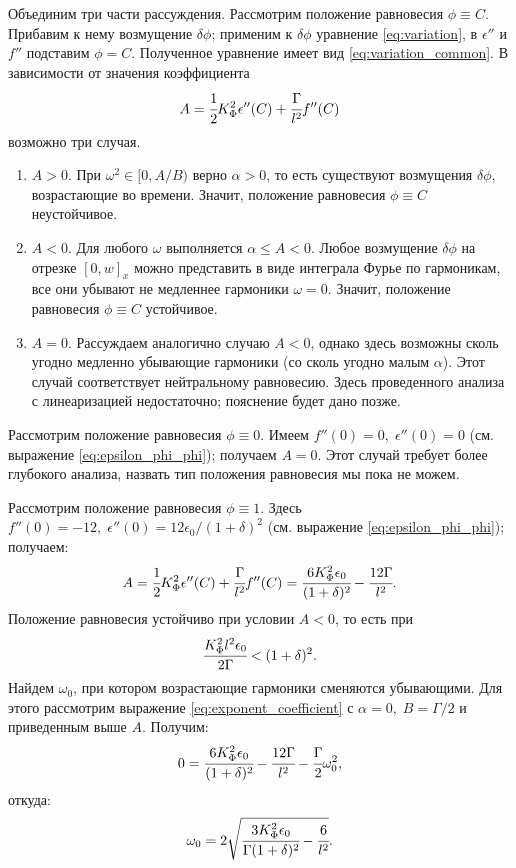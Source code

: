 Объединим три части рассуждения. Рассмотрим положение равновесия $\phi \equiv C$. Прибавим к нему возмущение $\delta \phi$; применим к $\delta \phi$ уравнение \eqref{eq:variation}, в $\epsilon''$ и $f''$ подставим $\phi = C$. Полученное уравнение имеет вид \eqref{eq:variation_common}. В зависимости от значения коэффициента
$$A = \cfrac{1}{2} K_\Phi^2 \epsilon''(C) + \cfrac{\Gamma}{l^2} f''(C)$$
возможно три случая.
\begin{enumerate}[label=\arabic*.]
	\item $A > 0$. При $\omega^2 \in [0, A/B)$ верно $\alpha > 0$, то есть существуют возмущения $\delta \phi$, возрастающие во времени. Значит, положение равновесия $\phi \equiv C$ неустойчивое.
	\item $A < 0$. Для любого $\omega$ выполняется $\alpha \leqslant A < 0$. Любое возмущение $\delta \phi$ на отрезке $[0, w]_x$ можно представить в виде интеграла Фурье по гармоникам, все они убывают не медленнее гармоники $\omega = 0$. Значит, положение равновесия $\phi \equiv C$ устойчивое.
	\item $A = 0$. Рассуждаем аналогично случаю $A < 0$, однако здесь возможны сколь угодно медленно убывающие гармоники (со сколь угодно малым $\alpha$). Этот случай соответствует нейтральному равновесию. Здесь проведенного анализа с линеаризацией недостаточно; пояснение будет дано позже.
\end{enumerate}

Рассмотрим положение равновесия $\phi \equiv 0$. Имеем $f''(0) = 0, \; \epsilon''(0) = 0$ (см. выражение \eqref{eq:epsilon_phi_phi}); получаем $A = 0$. Этот случай требует более глубокого анализа, назвать тип положения равновесия мы пока не можем.

Рассмотрим положение равновесия $\phi \equiv 1$. Здесь $f''(0) = -12, \; \epsilon''(0) = 12 \epsilon_0/(1 + \delta)^2$ (см. выражение \eqref{eq:epsilon_phi_phi}); получаем:
$$A = \cfrac{1}{2} K_\Phi^2 \epsilon''(C) + \cfrac{\Gamma}{l^2} f''(C) = \cfrac{6 K_\Phi^2 \epsilon_0}{(1 + \delta)^2} - \cfrac{12 \Gamma}{l^2} {\text{.}}$$
Положение равновесия устойчиво при условии $A < 0$, то есть при
\begin{equation}
	\cfrac{K_\Phi^2 l^2 \epsilon_0}{2 \Gamma} < (1 + \delta)^2 {\text{.}}
	\label{cond:equilibrium_1_stable}
\end{equation}
Найдем $\omega_0$, при котором возрастающие гармоники сменяются убывающими. Для этого рассмотрим выражение \eqref{eq:exponent_coefficient} с $\alpha = 0, \; B = \Gamma / 2$ и приведенным выше $A$. Получим:
$$0 = \cfrac{6 K_\Phi^2 \epsilon_0}{(1 + \delta)^2} - \cfrac{12 \Gamma}{l^2} - \cfrac{\Gamma}{2} \omega_0^2 {\text{,}}$$
откуда:
$$\omega_0 = 2 \sqrt{\cfrac{3 K_\Phi^2 \epsilon_0}{\Gamma (1 + \delta)^2} - \cfrac{6}{l^2}} {\text{.}}$$

